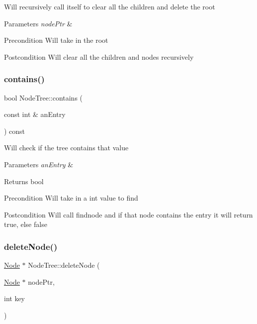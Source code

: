 Will recursively call itself to clear all the children and delete the root 
\begin{DoxyParams}{Parameters}
{\em node\+Ptr} & \\
\hline
\end{DoxyParams}
\begin{DoxyPrecond}{Precondition}
Will take in the root 
\end{DoxyPrecond}
\begin{DoxyPostcond}{Postcondition}
Will clear all the children and nodes recursively 
\end{DoxyPostcond}
\mbox{\label{class_node_tree_a7a0617d6f4b39f495da71613a05a098e}} 
\subsubsection{\texorpdfstring{contains()}{contains()}}
{\footnotesize\ttfamily bool Node\+Tree\+::contains (\begin{DoxyParamCaption}\item[{const int \&}]{an\+Entry }\end{DoxyParamCaption}) const}

Will check if the tree contains that value 
\begin{DoxyParams}{Parameters}
{\em an\+Entry} & \\
\hline
\end{DoxyParams}
\begin{DoxyReturn}{Returns}
bool 
\end{DoxyReturn}
\begin{DoxyPrecond}{Precondition}
Will take in a int value to find 
\end{DoxyPrecond}
\begin{DoxyPostcond}{Postcondition}
Will call findnode and if that node contains the entry it will return true, else false 
\end{DoxyPostcond}
\mbox{\label{class_node_tree_a4a02f5a4836ed05e0d51e946101982b8}} 
\subsubsection{\texorpdfstring{delete\+Node()}{deleteNode()}}
{\footnotesize\ttfamily \mbox{\hyperlink{class_node}{Node}} $\ast$ Node\+Tree\+::delete\+Node (\begin{DoxyParamCaption}\item[{\mbox{\hyperlink{class_node}{Node}} $\ast$}]{node\+Ptr,  }\item[{int}]{key }\end{DoxyParamCaption})}



